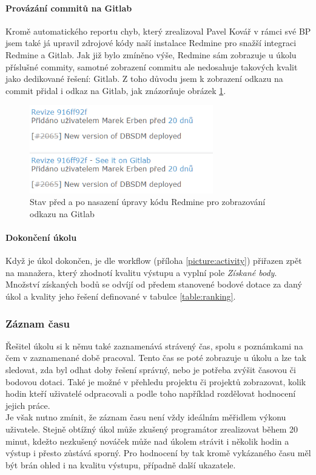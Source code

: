 \paragraph{Provázání commitů na Gitlab}
Kromě automatického reportu chyb, který zrealizoval Pavel Kovář v rámci své BP jsem také já upravil zdrojové kódy naší instalace Redmine pro snažší integraci Redmine a Gitlab. Jak již bylo zmíněno výše, Redmine sám zobrazuje u úkolu příslušné commity, samotné zobrazení commitu ale nedosahuje takových kvalit jako dedikované řešení: Gitlab. Z toho důvodu jsem k zobrazení odkazu na commit přidal i odkaz na Gitlab, jak znázorňuje obrázek \ref{picture:redmineTOgitlab}.
\begin{figure}[h]
\includegraphics[width=8cm]{../png/redmineTOgitlab.png}
\caption{Stav před a po nasazení úpravy kódu Redmine pro zobrazování odkazu na Gitlab} \label{picture:redmineTOgitlab}
\end{figure}

\paragraph{Dokončení úkolu}

Když je úkol dokončen, je dle workflow (příloha \ref{picture:activity}) přiřazen zpět na manažera, který zhodnotí kvalitu výstupu a vyplní pole \emph{Získané body}. Množství získaných bodů se odvíjí od předem stanovené bodové dotace za daný úkol a kvality jeho řešení definované v tabulce \ref{table:ranking}. 

\subsubsection{Záznam času} \label{redmine:time}

Řešitel úkolu si k němu také zaznamenává strávený čas, spolu s poznámkami na čem v zaznamenané době pracoval. Tento čas se poté zobrazuje u úkolu a lze tak sledovat, zda byl odhat doby řešení správný, nebo je potřeba zvýšit časovou či bodovou dotaci. Také je možné v přehledu projektu či projektů zobrazovat, kolik hodin kteří uživatelé odpracovali a podle toho například rozdělovat hodnocení jejich práce.\\
Je však nutno zmínit, že záznam času není vždy ideálním měřidlem výkonu uživatele. Stejně obtížný úkol může zkušený programátor zrealizovat během 20 minut, kdežto nezkušený nováček může nad úkolem strávit i několik hodin a výstup i přesto zůstává sporný. Pro hodnocení by tak kromě vykázaného času měl být brán ohled i na kvalitu výstupu, případně další ukazatele.


